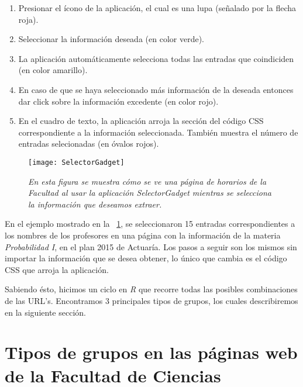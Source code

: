 \begin{enumerate}
\item Presionar el ícono de la aplicación, el cual es una lupa (señalado por la flecha roja).

\item Seleccionar la información deseada (en color verde).

\item La aplicación automáticamente selecciona todas las entradas que coindiciden (en color amarillo).

\item En caso de que se haya seleccionado más información de la deseada entonces dar click sobre la información excedente (en color rojo).

\item  En el cuadro de texto, la aplicación arroja la sección del código CSS correspondiente a la información seleccionada. También muestra el número de entradas selecionadas (en óvalos rojos).
\end{enumerate}


\begin{figure}[H]
\centering
\texttt{[image: SelectorGadget]} %
\caption[\textit{Uso de la aplicación SelectorGadget}]{\textit{En esta figura se muestra cómo se ve una página de horarios de la Facultad al usar la aplicación SelectorGadget mientras se selecciona la información que deseamos extraer.}}\label{appSelectorGadget}
\end{figure}

En el ejemplo mostrado en la \figurename{~\ref{appSelectorGadget}}, se seleccionaron 15 entradas correspondientes a los nombres de los profesores en una página con la información de la materia \textit{Probabilidad I}, en el plan 2015 de Actuaría. Los pasos a seguir son los mismos sin importar la información que se desea obtener, lo único que cambia es el código CSS que arroja la aplicación.

Sabiendo ésto, hicimos un ciclo en \textit{R} que recorre todas las posibles combinaciones de las URL's. Encontramos 3 principales tipos de grupos, los cuales describiremos en la siguiente sección.


\section{Tipos de grupos en las páginas web de la Facultad de Ciencias} \label{TiposDeGpos}

